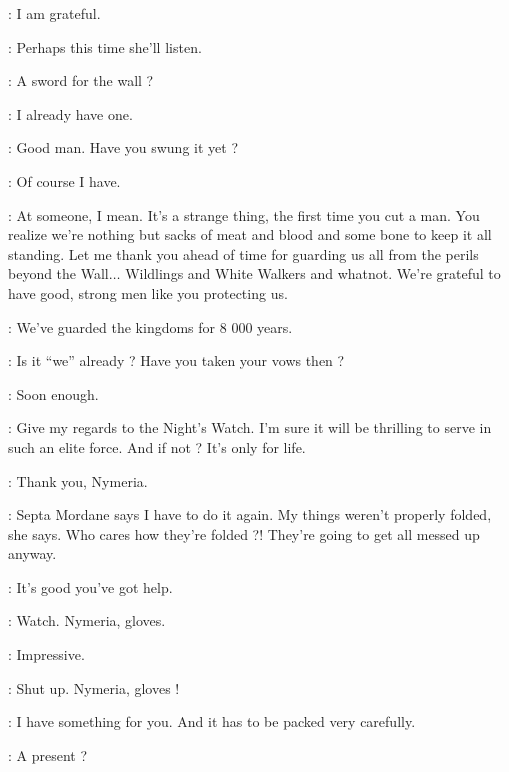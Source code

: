 \CATELYN: I am grateful. 

\CERSEI: Perhaps this time she'll listen. 

\scene



\JAIME: A sword for the wall ? 

\JON: I already have one. 

\JAIME: Good man. Have you swung it yet ? 

\JON: Of course I have. 

\JAIME: At someone, I mean. It's a strange thing, the first time you cut a man. You realize we're nothing but sacks of meat and blood and some bone to keep it all standing. Let me thank you ahead of time for guarding us all from the perils beyond the Wall$\ldots$ Wildlings and White Walkers and whatnot. We're grateful to have good, strong men like you protecting us. 

\JON: We've guarded the kingdoms for 8 000 years. 

\JAIME: Is it ``we'' already ? Have you taken your vows then ? 

\JON: Soon enough. 

\JAIME: Give my regards to the Night's Watch. I'm sure it will be thrilling to serve in such an elite force. And if not ? It's only for life. 

\scene



\ARYA: Thank you, Nymeria. 


\ARYA: Septa Mordane says I have to do it again. My things weren't properly folded, she says. Who cares how they're folded ?! They're going to get all messed up anyway. 

\JON: It's good you've got help. 

\ARYA: Watch. Nymeria, gloves.


\JON: Impressive. 

\ARYA: Shut up. Nymeria, gloves ! 


\JON: I have something for you. And it has to be packed very carefully. 

\ARYA: A present ? 

